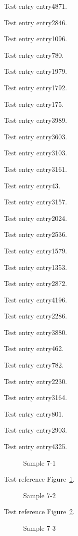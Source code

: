 Test entry \gls{entry4871}.

Test entry \gls{entry2846}.

Test entry \gls{entry1096}.

Test entry \gls{entry780}.

Test entry \gls{entry1979}.

Test entry \gls{entry1792}.

Test entry \gls{entry175}.

Test entry \gls{entry3989}.

Test entry \gls{entry3603}.

Test entry \gls{entry3103}.

Test entry \gls{entry3161}.

Test entry \gls{entry43}.

Test entry \gls{entry3157}.

Test entry \gls{entry2024}.

Test entry \gls{entry2536}.

Test entry \gls{entry1579}.

Test entry \gls{entry1353}.

Test entry \gls{entry2872}.

Test entry \gls{entry4196}.

Test entry \gls{entry2286}.

Test entry \gls{entry3880}.

Test entry \gls{entry462}.

Test entry \gls{entry782}.

Test entry \gls{entry2230}.

Test entry \gls{entry3164}.

Test entry \gls{entry801}.

Test entry \gls{entry2903}.

Test entry \gls{entry4325}.

\begin{figure}[tbhp]
\caption{Sample 7-1}
\label{fig:sample-7-1}
\end{figure}

Test reference Figure~\ref{fig:sample-7-1}.

\begin{figure}[tbhp]
\caption{Sample 7-2}
\label{fig:sample-7-2}
\end{figure}

Test reference Figure~\ref{fig:sample-7-2}.

\begin{figure}[tbhp]
\caption{Sample 7-3}
\label{fig:sample-7-3}
\end{figure}

